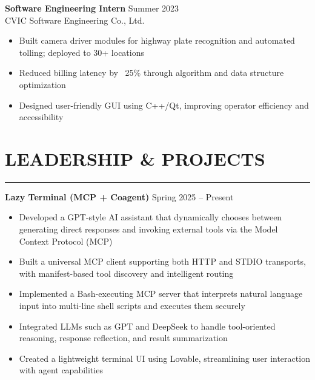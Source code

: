 \documentclass[letterpaper,10pt]{article}
\begin{document}
\textbf{Software Engineering Intern} \hfill Summer 2023\\
CVIC Software Engineering Co., Ltd.
\begin{itemize}[leftmargin=*]
	\item Built camera driver modules for highway plate recognition and automated tolling; deployed to 30+ locations
	\item Reduced billing latency by ~25\% through algorithm and data structure optimization
	\item Designed user-friendly GUI using C++/Qt, improving operator efficiency and accessibility
\end{itemize}


\section*{LEADERSHIP \& PROJECTS}
\hrule

\textbf{Lazy Terminal (MCP + Coagent)} \hfill Spring 2025 – Present  
\begin{itemize}[leftmargin=*]
    \item Developed a GPT-style AI assistant that dynamically chooses between generating direct responses and invoking external tools via the Model Context Protocol (MCP)
    \item Built a universal MCP client supporting both HTTP and STDIO transports, with manifest-based tool discovery and intelligent routing
    \item Implemented a Bash-executing MCP server that interprets natural language input into multi-line shell scripts and executes them securely
    \item Integrated LLMs such as GPT and DeepSeek to handle tool-oriented reasoning, response reflection, and result summarization
    \item Created a lightweight terminal UI using Lovable, streamlining user interaction with agent capabilities

\end{itemize}
\end{document}
